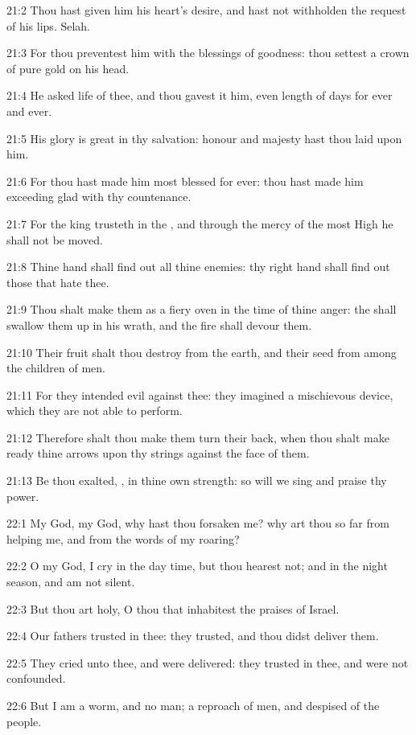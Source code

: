 21:2 Thou hast given him his heart's desire, and hast not withholden the request of his lips. Selah.

21:3 For thou preventest him with the blessings of goodness: thou settest a crown of pure gold on his head.

21:4 He asked life of thee, and thou gavest it him, even length of days for ever and ever.

21:5 His glory is great in thy salvation: honour and majesty hast thou laid upon him.

21:6 For thou hast made him most blessed for ever: thou hast made him exceeding glad with thy countenance.

21:7 For the king trusteth in the \LORD, and through the mercy of the most High he shall not be moved.

21:8 Thine hand shall find out all thine enemies: thy right hand shall find out those that hate thee.

21:9 Thou shalt make them as a fiery oven in the time of thine anger: the \LORD shall swallow them up in his wrath, and the fire shall devour them.

21:10 Their fruit shalt thou destroy from the earth, and their seed from among the children of men.

21:11 For they intended evil against thee: they imagined a mischievous device, which they are not able to perform.

21:12 Therefore shalt thou make them turn their back, when thou shalt make ready thine arrows upon thy strings against the face of them.

21:13 Be thou exalted, \LORD, in thine own strength: so will we sing and praise thy power.



22:1 My God, my God, why hast thou forsaken me? why art thou so far from helping me, and from the words of my roaring?

22:2 O my God, I cry in the day time, but thou hearest not; and in the night season, and am not silent.

22:3 But thou art holy, O thou that inhabitest the praises of Israel.

22:4 Our fathers trusted in thee: they trusted, and thou didst deliver them.

22:5 They cried unto thee, and were delivered: they trusted in thee, and were not confounded.

22:6 But I am a worm, and no man; a reproach of men, and despised of the people.

